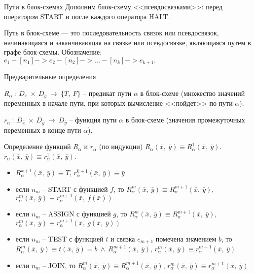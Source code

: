 \documentclass[hyperref={unicode=true}]{beamer}
\begin{document}
    \begin{frame}{Пути в блок-схемах}
    Дополним блок-схему <<псевдосвязками>>: перед оператором START и после каждого оператора HALT.

    Путь в блок-схеме --- это последовательность связок или псевдосвязок, начинающаяся и заканчивающая на связке или псевдосвязке, являющаяся путем в графе блок-схемы. Обозначение: $e_1 -[n_1]-> e_2 -[n_2] -> ... -[n_k]-> e_{k+1}.$
    \end{frame}

	\begin{frame}{Предварительные определения}
	\begin{block}{}
	$R_\alpha~:~D_{\bar{x}}~\times~D_{\bar{y}}~\rightarrow~\{T,~F\}$ -- предикат
		пути $\alpha$ в блок-схеме (множество значений переменных в начале пути,
		при которых вычисление <<пойдет>> по пути $\alpha$).
	\end{block}
	\begin{block}{}
	$r_\alpha~:~D_{\bar{x}}~\times~D_{\bar{y}}~\rightarrow~D_{\bar{y}}$ -- функция
		пути $\alpha$ в блок-схеме (значения промежуточных переменных в конце пути $\alpha$).
	\end{block}
	\end{frame}

	\begin{frame}{Определение функций $R_\alpha$ и $r_\alpha$ (по индукции)}
	$R_\alpha (\bar{x},~\bar{y}) \equiv R_\alpha^1 (\bar{x},~\bar{y})$.
	$r_\alpha (\bar{x},~\bar{y}) \equiv r_\alpha^1 (\bar{x},~\bar{y})$.

	\begin{itemize}
		\item $R_\alpha^{k+1} (\bar{x},~\bar{y}) \equiv T$, $r_\alpha^{k+1} (\bar{x},~\bar{y}) \equiv \bar{y}$
        \item если $n_m$ -- START с функцией $f$, то $R_\alpha^m (\bar{x},~\bar{y}) \equiv R_\alpha^{m+1}(\bar{x},~\bar{y})$, $r_\alpha^m(\bar{x},~\bar{y}) \equiv r_\alpha^{m+1}(\bar{x},~f(\bar{x}))$
		\item если $n_m$ -- ASSIGN с функцией $g$, то $R_\alpha^m (\bar{x},~\bar{y}) \equiv R_\alpha^{m+1} (\bar{x},~\bar{y})$, $r_\alpha^m (\bar{x},~\bar{y}) \equiv r_\alpha^{m+1} (\bar{x},~g(\bar{x},~\bar{y}))$
		\item если $n_m$ -- TEST с функцией $t$ и связка $e_{m+1}$ помечена значением $b$, то $R_\alpha^m (\bar{x},~\bar{y}) \equiv t(\bar{x},~\bar{y}) = b~\land~R_\alpha^{m+1} (\bar{x},~\bar{y})$, $r_\alpha^m (\bar{x},~\bar{y}) \equiv r_\alpha^{m+1} (\bar{x},~\bar{y}) $
		\item если $n_m$ -- JOIN, то $R_\alpha^m (\bar{x},~\bar{y}) \equiv R_\alpha^{m+1} (\bar{x},~\bar{y})$, $r_\alpha^m (\bar{x},~\bar{y}) \equiv r_\alpha^{m+1} (\bar{x},~\bar{y}) $
	\end{itemize}
	\end{frame}
\end{document}
